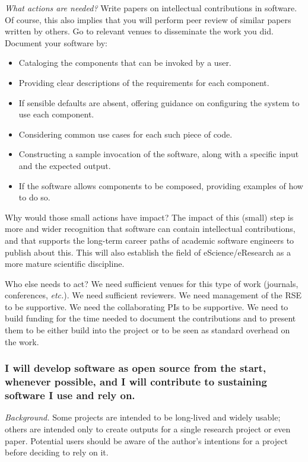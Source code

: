 \documentclass[a4paper,UKenglish]{dagman}
\renewcommand{\paragraph}[1]{\subsubsection*{#1}\xspace}
\newcommand{\etc}{\emph{etc.}\xspace}
\begin{document}
\emph{What actions are needed?}
Write papers on intellectual contributions in software. Of course, this also implies that you will perform peer review of similar papers written by others. Go to relevant venues to disseminate the work you did.
Document your software by:
\begin{itemize}
\item Cataloging the components that can be invoked by a user.
\item Providing clear descriptions of the requirements for each component.
\item If sensible defaults are absent, offering guidance on configuring the system to use each component.
\item Considering common use cases for each such piece of code.
\item Constructing a sample invocation of the software, along with a specific input and the expected output.
\item If the software allows components to be composed, providing examples of how to do so.
\end{itemize}


Why would those small actions have impact?
The impact of this (small) step is more and wider recognition that software can contain intellectual contributions, and that supports the long-term career paths of academic software engineers to publish about this. This will also establish the field of eScience/eResearch as a more mature scientific discipline.

Who else needs to act?
We need sufficient venues for this type of work (journals, conferences, \etc).  We need sufficient reviewers.  We need management of the RSE to be supportive.  We need the collaborating PIs to be supportive.  We need to build funding for the time needed to document the contributions and to present them to be either build into the project or to be seen as standard overhead on the work.

\paragraph{I will develop software as open source from the start, whenever possible, and I will contribute to sustaining software I use and rely on.}

\emph{Background.}
Some projects are intended to be long-lived and widely usable; others are intended only to create outputs for a single research project or even paper. Potential users should be aware of the author's intentions for a project before deciding to rely on it.  
\end{document}

